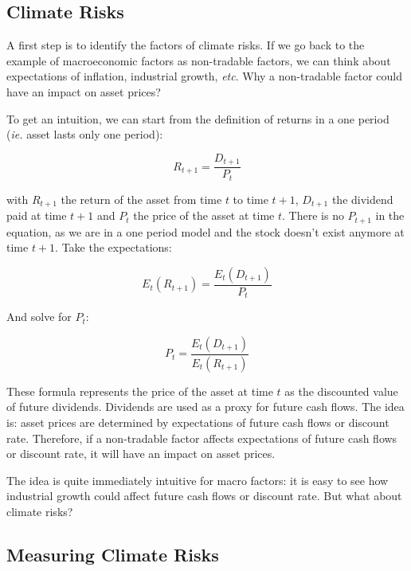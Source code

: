 \subsection{Climate Risks}

A first step is to identify the factors of climate risks.
If we go back to the example of macroeconomic factors 
as non-tradable factors, we can think about expectations 
of inflation, industrial growth, \textit{etc}. 
Why a non-tradable factor could have an impact on asset prices?

To get an intuition, we can start from the definition of 
returns in a one period  (\textit{ie.} asset lasts only one period):

\begin{equation}
    R_{t+1} = \frac{D_{t+1}}{P_t}
\end{equation}

with $R_{t+1}$ the return of the asset from time $t$ to time $t+1$, 
$D_{t+1}$ the dividend paid at time $t+1$ 
and $P_t$ the price of the asset at time $t$.
There is no $P_{t+1}$ in the equation, 
as we are in a one period model and 
the stock doesn't exist anymore at time $t+1$. Take the expectations:

\begin{equation}
    E_t(R_{t+1}) = \frac{E_t(D_{t+1})}{P_t}
\end{equation}

And solve for $P_t$:

\begin{equation}
    P_t = \frac{E_t(D_{t+1})}{E_t(R_{t+1})}
\end{equation}

These formula 
represents the price of the asset at time $t$ 
as the discounted value of future dividends.
Dividends are used as a proxy for future cash flows.
The idea is: asset prices are determined by
expectations of future cash flows or discount rate.
Therefore, if a non-tradable factor affects
expectations of future cash flows or discount rate,
it will have an impact on asset prices.

The idea is quite immediately intuitive for macro factors:
it is easy to see how industrial growth
could affect future cash flows or discount rate. 
But what about climate risks?





\subsection{Measuring Climate Risks}

